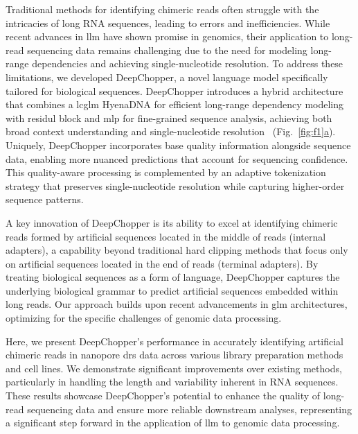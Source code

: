 \documentclass[pdflatex, sn-mathphys-num, lineno]{sn-jnl}%
\newcommand{\figref}[2]{Fig.~\hyperref[#1]{\ref*{#1}#2}}
\theoremstyle{thmstyleone}%
\theoremstyle{thmstyletwo}%
\theoremstyle{thmstylethree}%
\begin{document}
Traditional methods for identifying chimeric reads often struggle with the intricacies of long RNA sequences, leading to errors and inefficiencies.
While recent advances in \gls{llm} have shown promise in genomics, their application to long-read sequencing data remains challenging due to the need for modeling long-range dependencies and achieving single-nucleotide resolution\cite{dalla2023nucleotide, tay2022efficient, zhou2023dnabert2}.
To address these limitations, we developed DeepChopper, a novel language model specifically tailored for biological sequences.
DeepChopper introduces a hybrid architecture that combines a \gls{lcglm} HyenaDNA for efficient long-range dependency modeling with  residul block and mlp for fine-grained sequence analysis, achieving both broad context understanding and single-nucleotide resolution~\cite{poli2023hyena, nguyen2024hyenadna} (\figref{fig:f1}{a}).
Uniquely, DeepChopper incorporates base quality information alongside sequence data, enabling more nuanced predictions that account for sequencing confidence.
This quality-aware processing is complemented by an adaptive tokenization strategy that preserves single-nucleotide resolution while capturing higher-order sequence patterns.

A key innovation of DeepChopper is its ability to excel at identifying chimeric reads formed by artificial sequences located in the middle of reads (internal adapters), a capability beyond traditional hard clipping methods that focus only on artificial sequences located in the end of reads (terminal adapters).
By treating biological sequences as a form of language, DeepChopper captures the underlying biological grammar to predict artificial sequences embedded within long reads.
Our approach builds upon recent advancements in \gls{glm} architectures, optimizing for the specific challenges of genomic data processing\cite{nguyen2024hyenadna}.

Here, we present DeepChopper's performance in accurately identifying artificial chimeric reads in nanopore \gls{drs} data across various library preparation methods and cell lines.
We demonstrate significant improvements over existing methods, particularly in handling the length and variability inherent in RNA sequences.
These results showcase DeepChopper's potential to enhance the quality of long-read sequencing data and ensure more reliable downstream analyses, representing a significant step forward in the application of \gls{llm} to genomic data processing.


\end{document}
